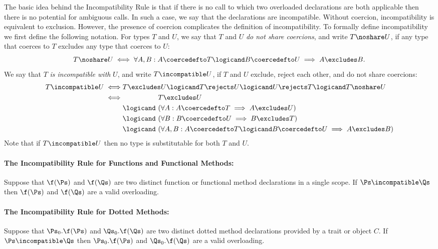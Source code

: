 The basic idea behind the Incompatibility Rule is that if there is no
call to which two overloaded declarations are both applicable
then there is no potential for ambiguous calls.  In such a case, we say
that the declarations are incompatible.
Without coercion, incompatibility is equivalent to exclusion.
However, the presence of coercion complicates the definition of
incompatibility.  To formally define incompatibility we first define the
following notation.
%
For types $T$ and $U$,
we say that $T$ and $U$ \emph{do not share coercions}, and write
$T \noshare U$, if any type that coerces to $T$ excludes any type
that coerces to $U$:
\[
T \noshare U \iff \forall A,B: A \coercedefto T \logicand B \coercedefto U
                               \implies A \excludes B.
\]
%
We say that $T$ \emph{is incompatible with} $U$, and write $T
\incompatible U$, if $T$ and $U$ exclude, reject each other, and do
not share coercions:
\begin{align*}
T \incompatible U \iff
&T \excludes U \logicand T \rejects U \logicand U \rejects T \logicand  T \noshare U \\
\iff
&\phantom{\logicand\ } T \excludes U \\
&\logicand\ (\forall A: A \coercedefto T \implies A \excludes U) \\
&\logicand\ (\forall B: B \coercedefto U \implies B \excludes T) \\
&\logicand\ (\forall A,B: A \coercedefto T \logicand B \coercedefto U
                          \implies A \excludes B)
\end{align*}
Note that if $T \incompatible U$ then no type is substitutable for
both $T$ and $U$.

\paragraph{The Incompatibility Rule for Functions and Functional Methods:}

Suppose that $\f(\Ps)$ and $\f(\Qs)$ are two distinct function or
functional method declarations in a single scope.
If $\Ps \incompatible \Qs$ then $\f(\Ps)$ and $\f(\Qs)$ are a valid overloading.

\paragraph{The Incompatibility Rule for Dotted Methods:}
Suppose that $\Ps_0.\f(\Ps)$ and $\Qs_0.\f(\Qs)$ are two distinct
dotted method declarations provided by a trait or object $C$.  If
$\Ps \incompatible \Qs$ then $\Ps_0.\f(\Ps)$ and $\Qs_0.\f(\Qs)$ are
a valid overloading.

